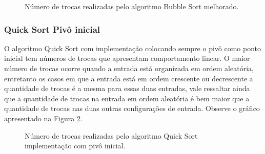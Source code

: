 \documentclass[conference,onecolumn]{IEEEtran}
\begin{document}
\begin{figure}[H]
\begin{center}
\end{center}
\caption{Número de trocas realizadas pelo algoritmo Bubble Sort melhorado.}
\label{graf:bubble-sort-melhorado-troca}
\end{figure}

\subsubsection{Quick Sort Pivô inicial}

O algoritmo Quick Sort com implementação colocando sempre o pivô como ponto inicial tem números de trocas que apresentam comportamento linear. O maior número de trocas ocorre quando a entrada está organizada em ordem aleatória, entretanto os casos em que a entrada está em ordem crescente ou decrescente a quantidade de trocas é a mesma para essas duas entradas, vale ressaltar ainda que a quantidade de trocas na entrada em ordem aleatória é bem maior que a quantidade de trocas nas duas outras configurações de entrada. Observe o gráfico apresentado na Figura \ref{graf:quick-inicial-troca}.

\begin{figure}[H]
\begin{center}
\end{center}
\caption{Número de trocas realizadas pelo algoritmo Quick Sort implementação com pivô inicial.}
\label{graf:quick-inicial-troca}
\end{figure}
\end{document}
